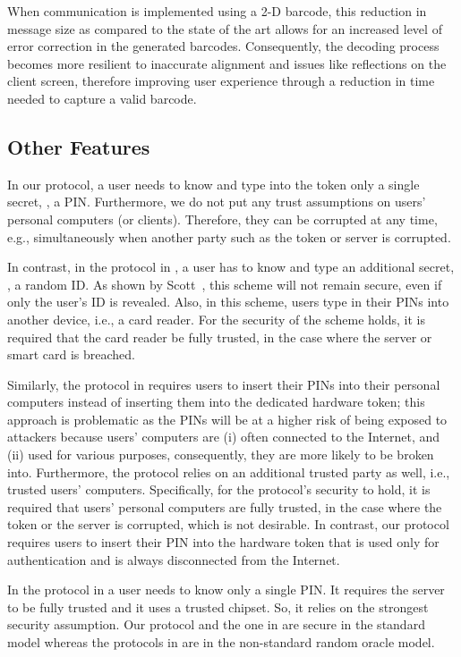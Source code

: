 When communication is implemented using a 2-D barcode, this reduction in message size as compared to the state of the art allows for an increased level of error correction in the generated barcodes.
Consequently, the decoding process becomes more resilient to inaccurate alignment and issues like reflections on the client screen, therefore improving user experience through a reduction in time needed to capture a valid barcode.


\subsection{Other Features}
 In our protocol, a user needs to know and type into the token only a single secret, \ie, a PIN. Furthermore, we do not put any trust assumptions on users' personal computers (or clients). Therefore, they can be corrupted at any time, e.g., simultaneously when another party such as the token or server is corrupted. 
 
 In contrast, in the protocol in \cite{WangW18}, a user has to know and type an additional secret, \ie, a random ID. As shown by Scott~\cite{Scott12a}, this scheme will not remain secure, even if only the user's ID is revealed. Also, in this scheme, users type in their PINs into another device, i.e., a card reader. For the security of the scheme holds, it is required that the card reader be fully trusted, in the case where the server or smart card is breached. 
 
  
   Similarly, the protocol in \cite{JareckiJKSS21} requires users to insert their PINs into their personal computers instead of inserting them into the dedicated hardware token; this approach is problematic as the PINs will be at a higher risk of being exposed to attackers because users' computers are (i) often connected to the Internet, and (ii) used for various purposes, consequently, they are more likely to be broken into. Furthermore, the protocol relies on an additional trusted party as well, i.e., trusted users' computers. Specifically, for the protocol's security to hold, it is required that users' personal computers are fully trusted, in the case where the token or the server is corrupted, which is not desirable. In contrast, our protocol requires users to insert their PIN into the hardware token that is used only for authentication and is always disconnected from the Internet. 
 
 In the protocol in \cite{MatsuoMY11} a user needs to know only a single PIN. It requires the server to be fully trusted and it uses a trusted chipset. So, it relies on the strongest security assumption. 
Our protocol and the one in \cite{MatsuoMY11} are secure in the standard model whereas the protocols in \cite{WangW18,JareckiJKSS21} are in the non-standard random oracle model. 

